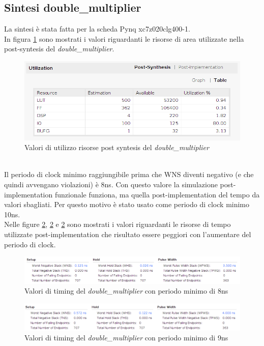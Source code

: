 \documentclass[]{IEEEtran}
\begin{document}
\subsection{Sintesi double\_multiplier}
La sintesi è stata fatta per la scheda Pynq xc7z020clg400-1.
\\In figura \ref{fig:UTIL_SYNT_DM} sono mostrati i valori riguardanti le risorse di area utilizzate nella post-syntesis del \textit{double\_multiplier}.
\begin{figure}[!htb]
    \centering
    \includegraphics[width=0.9\linewidth]{figures/util_synt_dm}
    \caption{Valori di utilizzo risorse post syntesis del \textit{double\_multiplier}}
    \label{fig:UTIL_SYNT_DM}
\end{figure}
\\Il periodo di clock minimo raggiungibile prima che WNS diventi negativo (e che quindi avvengano violazioni) è 8ns. Con questo valore la simulazione post-implementation funzionale funziona, ma quella post-implementation del tempo da valori sbagliati. Per questo motivo è stato usato come periodo di clock minimo 10ns. \\Nelle figure \ref{fig:TIMING_DM_8}, \ref{fig:TIMING_DM_8} e \ref{fig:TIMING_DM_8} sono mostrati i valori riguardanti le risorse di tempo utilizzate post-implementation che risultato essere peggiori con l'aumentare del periodo di clock.
\begin{figure}[!htb]
    \centering
    \includegraphics[width=1.0\linewidth]{figures/8-timing}
    \caption{Valori di timing del \textit{double\_multiplier} con periodo minimo di 8ns}
    \label{fig:TIMING_DM_8}
\end{figure}
\begin{figure}[!htb]
    \centering
    \includegraphics[width=1.0\linewidth]{figures/9-timing}
    \caption{Valori di timing del \textit{double\_multiplier} con periodo minimo di 9ns}
    \label{fig:TIMING_DM_9}
\end{figure}
\end{document}
